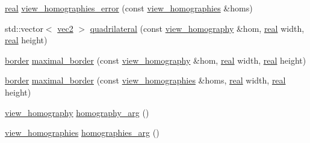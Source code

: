 \begin{DoxyCompactItemize}
\item 
\hyperlink{namespacetlz_a15fd37cce97f2b8b606af18c2615f602}{real} \hyperlink{namespacetlz_a34afcd6e35245c38371a50dfd9ab1971}{view\+\_\+homographies\+\_\+error} (const \hyperlink{namespacetlz_abd9713860da221719662169bd1821a9d}{view\+\_\+homographies} \&homs)
\item 
std\+::vector$<$ \hyperlink{namespacetlz_ae192989bfbe6c700ac84d2a8cf05ebb4}{vec2} $>$ \hyperlink{namespacetlz_ab111b1a9325e29c39936e5d7443ade4d}{quadrilateral} (const \hyperlink{structtlz_1_1view__homography}{view\+\_\+homography} \&hom, \hyperlink{namespacetlz_a15fd37cce97f2b8b606af18c2615f602}{real} width, \hyperlink{namespacetlz_a15fd37cce97f2b8b606af18c2615f602}{real} height)
\item 
\hyperlink{structtlz_1_1border}{border} \hyperlink{namespacetlz_a55aaec653a81676fbd03d8eacef449f0}{maximal\+\_\+border} (const \hyperlink{structtlz_1_1view__homography}{view\+\_\+homography} \&hom, \hyperlink{namespacetlz_a15fd37cce97f2b8b606af18c2615f602}{real} width, \hyperlink{namespacetlz_a15fd37cce97f2b8b606af18c2615f602}{real} height)
\item 
\hyperlink{structtlz_1_1border}{border} \hyperlink{namespacetlz_ac1020fe4e88b99fc400ff61a0923ef49}{maximal\+\_\+border} (const \hyperlink{namespacetlz_abd9713860da221719662169bd1821a9d}{view\+\_\+homographies} \&homs, \hyperlink{namespacetlz_a15fd37cce97f2b8b606af18c2615f602}{real} width, \hyperlink{namespacetlz_a15fd37cce97f2b8b606af18c2615f602}{real} height)
\item 
\hyperlink{structtlz_1_1view__homography}{view\+\_\+homography} \hyperlink{namespacetlz_a3ac10800719e65de4ff54112b989a8a7}{homography\+\_\+arg} ()
\item 
\hyperlink{namespacetlz_abd9713860da221719662169bd1821a9d}{view\+\_\+homographies} \hyperlink{namespacetlz_a734b9ad6a1a4eff4fc7972ff6b8e0b76}{homographies\+\_\+arg} ()
\end{DoxyCompactItemize}
